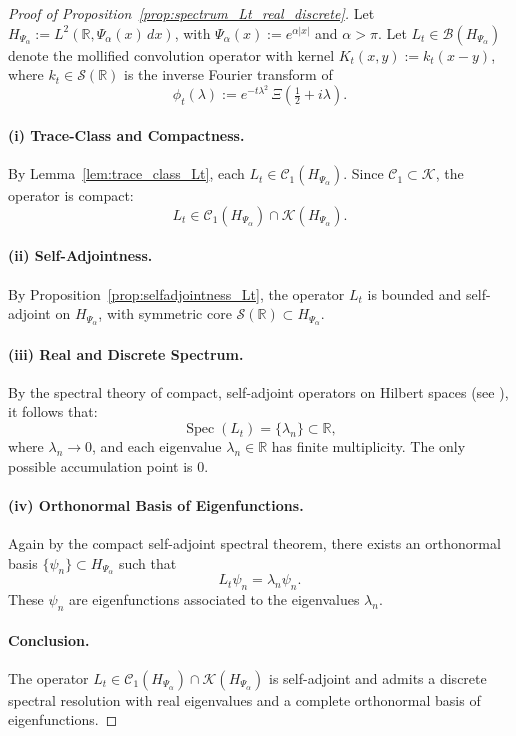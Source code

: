 \begin{proof}[Proof of Proposition~\ref{prop:spectrum_Lt_real_discrete}]
Let \( H_{\Psi_\alpha} := L^2(\mathbb{R}, \Psi_\alpha(x)\, dx) \), with \( \Psi_\alpha(x) := e^{\alpha |x|} \) and \( \alpha > \pi \). Let \( L_t \in \mathcal{B}(H_{\Psi_\alpha}) \) denote the mollified convolution operator with kernel \( K_t(x,y) := k_t(x - y) \), where \( k_t \in \mathcal{S}(\mathbb{R}) \) is the inverse Fourier transform of
\[
\phi_t(\lambda) := e^{-t\lambda^2} \, \Xi\left( \tfrac{1}{2} + i\lambda \right).
\]

\paragraph{(i) Trace-Class and Compactness.}
By Lemma~\ref{lem:trace_class_Lt}, each \( L_t \in \mathcal{C}_1(H_{\Psi_\alpha}) \). Since \( \mathcal{C}_1 \subset \mathcal{K} \), the operator is compact:
\[
L_t \in \mathcal{C}_1(H_{\Psi_\alpha}) \cap \mathcal{K}(H_{\Psi_\alpha}).
\]

\paragraph{(ii) Self-Adjointness.}
By Proposition~\ref{prop:selfadjointness_Lt}, the operator \( L_t \) is bounded and self-adjoint on \( H_{\Psi_\alpha} \), with symmetric core \( \mathcal{S}(\mathbb{R}) \subset H_{\Psi_\alpha} \).

\paragraph{(iii) Real and Discrete Spectrum.}
By the spectral theory of compact, self-adjoint operators on Hilbert spaces (see \cite[Thm.~VI.16]{ReedSimon1980I}), it follows that:
\[
\operatorname{Spec}(L_t) = \{ \lambda_n \} \subset \mathbb{R},
\]
where \( \lambda_n \to 0 \), and each eigenvalue \( \lambda_n \in \mathbb{R} \) has finite multiplicity. The only possible accumulation point is 0.

\paragraph{(iv) Orthonormal Basis of Eigenfunctions.}
Again by the compact self-adjoint spectral theorem, there exists an orthonormal basis \( \{ \psi_n \} \subset H_{\Psi_\alpha} \) such that
\[
L_t \psi_n = \lambda_n \psi_n.
\]
These \( \psi_n \) are eigenfunctions associated to the eigenvalues \( \lambda_n \).

\paragraph{Conclusion.}
The operator \( L_t \in \mathcal{C}_1(H_{\Psi_\alpha}) \cap \mathcal{K}(H_{\Psi_\alpha}) \) is self-adjoint and admits a discrete spectral resolution with real eigenvalues and a complete orthonormal basis of eigenfunctions.
\end{proof}
% 